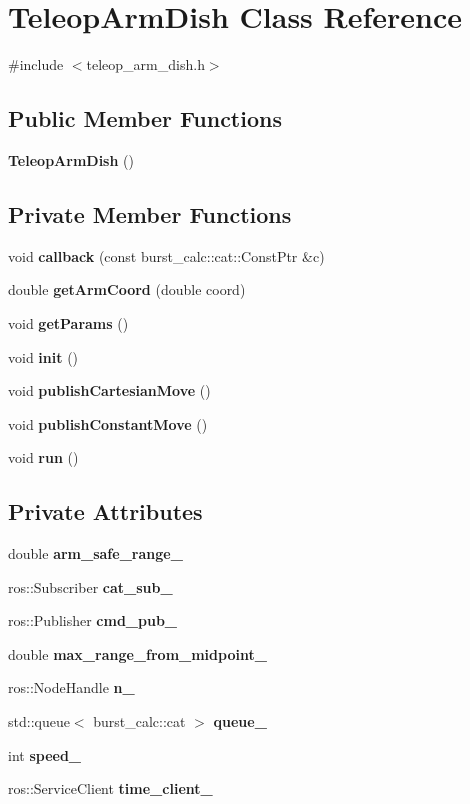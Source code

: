 \section{\-Teleop\-Arm\-Dish \-Class \-Reference}
\label{classTeleopArmDish}


{\ttfamily \#include $<$teleop\-\_\-arm\-\_\-dish.\-h$>$}

\subsection*{\-Public \-Member \-Functions}
\begin{DoxyCompactItemize}
\item 
{\bf \-Teleop\-Arm\-Dish} ()
\end{DoxyCompactItemize}
\subsection*{\-Private \-Member \-Functions}
\begin{DoxyCompactItemize}
\item 
void {\bf callback} (const burst\-\_\-calc\-::cat\-::\-Const\-Ptr \&c)
\item 
double {\bf get\-Arm\-Coord} (double coord)
\item 
void {\bf get\-Params} ()
\item 
void {\bf init} ()
\item 
void {\bf publish\-Cartesian\-Move} ()
\item 
void {\bf publish\-Constant\-Move} ()
\item 
void {\bf run} ()
\end{DoxyCompactItemize}
\subsection*{\-Private \-Attributes}
\begin{DoxyCompactItemize}
\item 
double {\bf arm\-\_\-safe\-\_\-range\-\_\-}
\item 
ros\-::\-Subscriber {\bf cat\-\_\-sub\-\_\-}
\item 
ros\-::\-Publisher {\bf cmd\-\_\-pub\-\_\-}
\item 
double {\bf max\-\_\-range\-\_\-from\-\_\-midpoint\-\_\-}
\item 
ros\-::\-Node\-Handle {\bf n\-\_\-}
\item 
std\-::queue$<$ burst\-\_\-calc\-::cat $>$ {\bf queue\-\_\-}
\item 
int {\bf speed\-\_\-}
\item 
ros\-::\-Service\-Client {\bf time\-\_\-client\-\_\-}
\end{DoxyCompactItemize}


